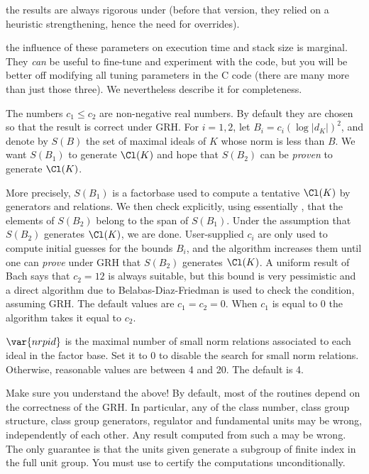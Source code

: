 \item the results are always rigorous under  (before that version,
they relied on a heuristic strengthening, hence the need for overrides).

\item the influence of these parameters on execution time and stack size is
marginal. They \emph{can} be useful to fine-tune and experiment with the
 code, but you will be better off modifying all tuning
parameters in the C code (there are many more than just those three).
We nevertheless describe it for completeness.

The numbers $c_1 \leq c_2$ are non-negative real numbers. By default they are
chosen so that the result is correct under GRH. For $i = 1,2$, let
$B_i = c_i(\log |d_K|)^2$, and denote by $S(B)$ the set of maximal ideals of
$K$ whose norm is less than $B$. We want $S(B_1)$ to generate $\Cl(K)$ and hope
that $S(B_2)$ can be \emph{proven} to generate $\Cl(K)$.

More precisely, $S(B_1)$ is a factorbase used to compute a tentative
$\Cl(K)$ by generators and relations. We then check explicitly, using
essentially , that the elements of $S(B_2)$ belong to the
span of $S(B_1)$. Under the assumption that $S(B_2)$ generates $\Cl(K)$, we
are done. User-supplied $c_i$ are only used to compute initial guesses for
the bounds $B_i$, and the algorithm increases them until one can \emph{prove}
under GRH that $S(B_2)$ generates $\Cl(K)$. A uniform result of Bach says
that $c_2 = 12$ is always suitable, but this bound is very pessimistic and a
direct algorithm due to Belabas-Diaz-Friedman is used to check the condition,
assuming GRH. The default values are $c_1 = c_2 = 0$. When $c_1$ is equal to
$0$ the algorithm takes it equal to $c_2$.

$\var{nrpid}$ is the maximal number of small norm relations associated to each
ideal in the factor base. Set it to $0$ to disable the search for small norm
relations. Otherwise, reasonable values are between 4 and 20. The default is
4.

 Make sure you understand the above! By default, most of
the  routines depend on the correctness of the GRH. In particular,
any of the class number, class group structure, class group generators,
regulator and fundamental units may be wrong, independently of each other.
Any result computed from such a  may be wrong. The only guarantee is
that the units given generate a subgroup of finite index in the full unit
group. You must use  to certify the computations
unconditionally.

